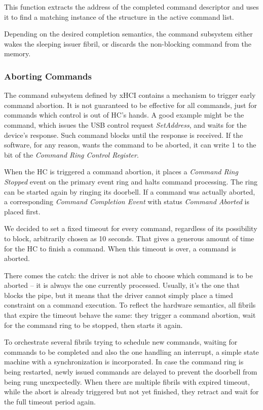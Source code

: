 This function extracts the address of the completed command descriptor and uses
it to find a matching instance of the  structure in the
active command list.

Depending on the desired completion semantics, the command subsystem either
wakes the sleeping issuer fibril, or discards the non-blocking command from the
memory.


\subsubsection{Aborting Commands}

The command subsystem defined by xHCI contains a mechanism to trigger early
command abortion. It is not guaranteed to be effective for all commands, just
for commands which control is out of HC's hands. A good example might be the
 command, which issues the USB control request
\emph{SetAddress}, and waits for the device's response. Such command blocks
until the response is received. If the software, for any reason, wants the
command to be aborted, it can write 1 to the  bit of the
\emph{Command Ring Control Register}.

When the HC is triggered a command abortion, it places a \emph{Command Ring
Stopped} event on the primary event ring and halts command processing. The ring
can be started again by ringing its doorbell. If a command was actually
aborted, a corresponding \emph{Command Completion Event} with status
\emph{Command Aborted} is placed first.

We decided to set a fixed timeout for every command, regardless of its
possibility to block, arbitrarily chosen as 10 seconds. That gives a generous
amount of time for the HC to finish a command. When this timeout is over,
a command is aborted.

There comes the catch: the driver is not able to choose which command is to be
aborted -- it is always the one currently processed. Usually, it's the one that
blocks the pipe, but it means that the driver cannot simply place a timed
constraint on a command execution. To reflect the hardware semantics, all
fibrils that expire the timeout behave the same: they trigger a command
abortion, wait for the command ring to be stopped, then starts it again.

To orchestrate several fibrils trying to schedule new commands, waiting for
commands to be completed and also the one handling an interrupt, a simple state
machine with a synchronization is incorporated. In case the command ring is
being restarted, newly issued commands are delayed to prevent the doorbell from
being rung unexpectedly. When there are multiple fibrils with expired timeout,
while the abort is already triggered but not yet finished, they retract and
wait for the full timeout period again.

